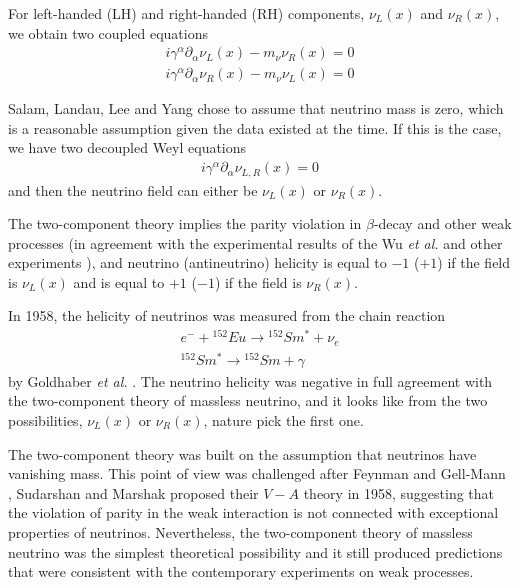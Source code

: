 \documentclass[english]{article}
\begin{document}
    For left-handed (LH) and right-handed (RH) components, $\nu_{L} (x)$ and  $\nu_{R} (x)$, we obtain two coupled equations
    \begin{gather}
    	i\gamma^{\alpha} \partial_{\alpha} \nu_{L} (x) - m_{\nu} \nu_{R} (x) = 0 \\
        i\gamma^{\alpha} \partial_{\alpha} \nu_{R} (x) - m_{\nu} \nu_{L} (x) = 0
    \end{gather}
    
    Salam, Landau, Lee and Yang chose to assume that neutrino mass is zero, which is a reasonable assumption given the data existed at the time. If this is the case, we have two decoupled Weyl equations
    \begin{gather}
    	i\gamma^{\alpha} \partial_{\alpha} \nu_{L,R} (x) = 0
    \end{gather}
    and then the neutrino field can either be $\nu_{L} (x)$ or $\nu_{R} (x)$.
    
    The two-component theory implies the parity violation in $\beta$-decay and other weak processes (in agreement with the experimental results of the Wu \textit{et al.} and other experiments \cite{wu1957} \cite{garwinledermanweinrich1957}), and neutrino (antineutrino) helicity is equal to $-1$ ($+1$) if the field is $\nu_{L} (x)$ and is equal to $+1$ ($-1$) if the field is $\nu_{R} (x)$.
    
    In 1958, the helicity of neutrinos was measured from the chain reaction
    \begin{gather}
    	e^{-} + {}^{152} Eu \rightarrow {}^{152} Sm^{*} + \nu_{e} \\
        {}^{152} Sm^{*} \rightarrow {}^{152} Sm + \gamma
    \end{gather}
    by Goldhaber \textit{et al.} \cite{goldhabergrodzinssunyar1958}. The neutrino helicity was negative in full agreement with the two-component theory of massless neutrino, and it looks like from the two possibilities, $\nu_{L} (x)$ or $\nu_{R} (x)$, nature pick the first one.
    
    The two-component theory was built on the assumption that neutrinos have vanishing mass. This point of view was challenged after Feynman and Gell-Mann \cite{feynmangellmann1958}, Sudarshan and Marshak \cite{sudarshanmarshak1958} proposed their $V - A$ theory in 1958, suggesting that the violation of parity in the weak interaction is not connected with exceptional properties of neutrinos. Nevertheless, the two-component theory of massless neutrino was the simplest theoretical possibility and it still produced predictions that were consistent with the contemporary experiments on weak processes.
    
\end{document}
